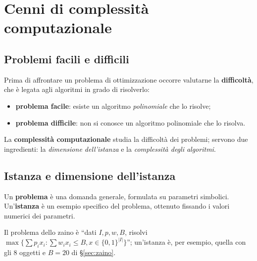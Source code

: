 \chapter{Cenni di complessità computazionale}\label{cap:compl}

\section{Problemi facili e difficili}

Prima di affrontare un problema di ottimizzazione occorre valutarne la \textbf{difficoltà}, che è legata agli algoritmi in grado di risolverlo:
\begin{itemize}[nosep]
\item \textbf{problema facile}: esiste un algoritmo \emph{polinomiale} che lo risolve;
\item \textbf{problema difficile}: non si conosce un algoritmo polinomiale che lo risolva.
\end{itemize}
La \textbf{complessità computazionale} studia la difficoltà dei problemi; servono due ingredienti: la \emph{dimensione dell'istanza} e la \emph{complessità degli algoritmi}.

\section{Istanza e dimensione dell'istanza}

\begin{defbox}
Un \textbf{problema} è una domanda generale, formulata su parametri simbolici. Un'\textbf{istanza} è un esempio specifico del problema, ottenuto fissando i valori numerici dei parametri.
\end{defbox}
Il problema dello zaino è ``dati $I,p,w,B$, risolvi $\max\{\sum p_ix_i:\sum w_ix_i\le B, x\in\{0,1\}^{|I|}\}$''; un'istanza è, per esempio, quella con gli 8 oggetti e $B=20$ di \S\ref{sec:zaino}.

